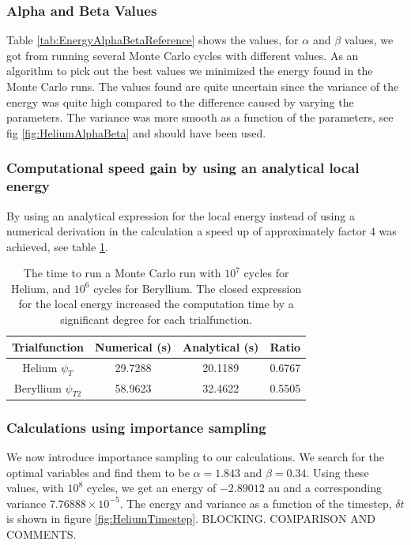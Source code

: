 		\subsubsection{Alpha and Beta Values}

			Table \ref{tab:EnergyAlphaBetaReference} shows the values, for \(\alpha\) and \(\beta\) values, we got from  running several Monte Carlo cycles with different values. As an algorithm to pick out the best values we minimized the energy found in the Monte Carlo runs. The values found are quite uncertain since the variance of the energy was quite high compared to the difference caused by varying the parameters. The variance was more smooth as a function of the parameters, see fig \ref{fig:HeliumAlphaBeta} and should have been used.




		\subsubsection{Computational speed gain by using an analytical local energy}
			By using an analytical expression for the local energy instead of using a numerical derivation in the calculation a speed up of approximately factor \(4\) was achieved, see table \ref{tab:analyticVSNumeric}.

			\begin{table}
				\center
				\begin{tabular}{| c | c | c | c |}
				    \hline
				   	\textbf{Trialfunction} & Numerical (s) & Analytical (s) & Ratio
				    \\ \hline
				    Helium $\psi_{T}$ & 29.7288 & 20.1189	& 0.6767
				    \\	\hline
				    Beryllium $\psi_{T2}$ & 58.9623  &	32.4622 & 0.5505
					    \\ \hline
				\end{tabular}
				\caption{The time to run a Monte Carlo run with \(10^7\) cycles for Helium, and \(10^6\) cycles for Beryllium. The closed expression for the local energy increased the computation time by a significant degree for each trialfunction. }
				\label{tab:analyticVSNumeric}
			\end{table}

		\subsubsection{Calculations using importance sampling}
			We now introduce importance sampling to our calculations. We search for the optimal variables and find them to be $\alpha=1.843$ and $\beta=0.34$. Using these values, with $10^{8}$ cycles, we get an energy of $-2.89012$ au and a corresponding variance $7.76888\times10^{-5}$. The energy and variance as a function of the timestep, $\delta t$ is shown in figure \ref{fig:HeliumTimestep}. BLOCKING. COMPARISON AND COMMENTS. 

